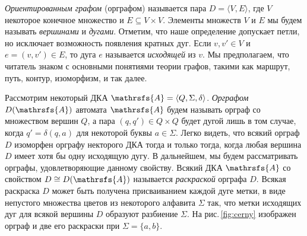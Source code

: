 \documentclass[11pt]{article}
\newtheorem{lemma}{Лемма}
\begin{document}


\emph{Ориентированным графом} (орграфом) называется пара $D=\langle V,E\rangle$,
где $V$ некоторое конечное множество и $E\subseteq V\times V$. 
Элементы множеств $V$ и $E$ мы будем называть \emph{вершинами} и \emph{дугами}. 
Отметим, что наше определение допускает петли, но исключает возможность появления
кратных дуг. Если $v,v'\in V$ и $e=(v,v')\in E$, то дуга $e$ называется
\emph{исходящей} из $v$. Мы предполагаем, что читатель знаком с основными понятиями
теории графов, такими как маршрут,
путь, контур, изоморфизм, и так далее.



Рассмотрим некоторый ДКА $\mathrsfs{A}=\langle Q,\Sigma,\delta\rangle$.
\emph{Орграфом} $D(\mathrsfs{A})$ автомата $\mathrsfs{A}$ будем 
называть орграф со множеством вершин $Q$, а пара $(q,q')\in Q\times Q$ будет 
дугой лишь в том случае, когда $q'=\delta(q,a)$ для некоторой буквы $a\in\Sigma$.
Легко видеть, что всякий орграф $D$ изоморфен орграфу некторого ДКА тогда и только тогда,
когда любая вершина $D$ имеет хотя бы одну исходящую дугу. В дальнейшем, мы будем 
рассматривать орграфы, удовлетворяющие данному свойству.  
Всякий ДКА $\mathrsfs{A}$ со свойством $D\cong D(\mathrsfs{A})$ называется
\emph{раскраской} орграфа $D$. Всякая раскраска $D$ может быть получена
присваиванием каждой дуге метки, в виде непустого множества цветов из некоторого алфавита $\Sigma$ так, 
что метки исходящих дуг для всякой вершины $D$ образуют разбиение $\Sigma$. На рис.\,\ref{fig:cerny} 
изображен орграф и две его раскраски при $\Sigma=\{a,b\}$.
\end{document}
